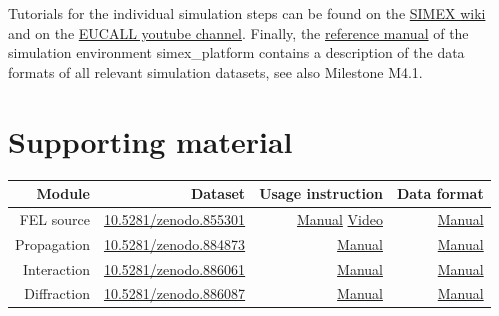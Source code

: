 \documentclass[12pt]{scrartcl}
\begin{document}
Tutorials for the individual simulation steps can be found on the
\href{https://www.github.com/eucall-software/simex_platform/wiki/SimEx-Tutorial}{SIMEX wiki} and
on the
\href{https://www.youtube.com/channel/UC5H8cATZiUPNfF7P_xEhBpQ/videos}{EUCALL youtube channel}.
Finally, the \href{https://eucall-software.github.io/simex_platform/}{reference manual} of the simulation environment simex\_platform
contains a description of the data formats of all relevant simulation datasets, see also
Milestone M4.1.

\section{Supporting material}
\begin{tabular}[ht]{|r|r|r|r|}
  \hline
  \textbf{Module}       & \textbf{Dataset}  &
  \textbf{Usage instruction}   & \textbf{Data format}       \\
  \hline
    FEL source &
    \href{https://dx.doi.org/10.5281/zenodo.855301}{10.5281/zenodo.855301} &
    \href{https://github.com/eucall-software/simex_platform/wiki/SimEx-Tutorial#prepating-the-source-input}{Manual}
    \href{https://youtu.be/Ql1p5-CLHug}{Video} &
    \href{https://eucall-software.github.io/simex_platform/#fel-source-calculations-fast}{Manual}
  \\
    Propagation &
    \href{https://dx.doi.org/10.5281/zenodo.884873}{10.5281/zenodo.884873} &
    \href{https://github.com/eucall-software/simex_platform/wiki/SimEx-Tutorial#beamline-propagation}{Manual} &
    \href{https://eucall-software.github.io/simex_platform/#coherent-wavefront-propagation-wpg-srw}{Manual}
  \\
    Interaction &
    \href{https://dx.doi.org/10.5281/zenodo.886061}{10.5281/zenodo.886061} &
    \href{https://github.com/eucall-software/simex_platform/wiki/SimEx-Tutorial#photon-matter-interaction}{Manual} &
    \href{https://eucall-software.github.io/simex_platform/#photon-matter-interaction-xmdyn}{Manual}
  \\
    Diffraction &
    \href{https://dx.doi.org/10.5281/zenodo.886087}{10.5281/zenodo.886087} &
    \href{https://github.com/eucall-software/simex_platform/wiki/SimEx-Tutorial#diffraction}{Manual} &
    \href{https://eucall-software.github.io/simex_platform/#diffraction-singfel}{Manual}
  \\
  \hline
\end{tabular}
%

\printbibliography[notkeyword=zenodo,notkeyword=tutorial, title={Articles}]
%
%
\end{document}
